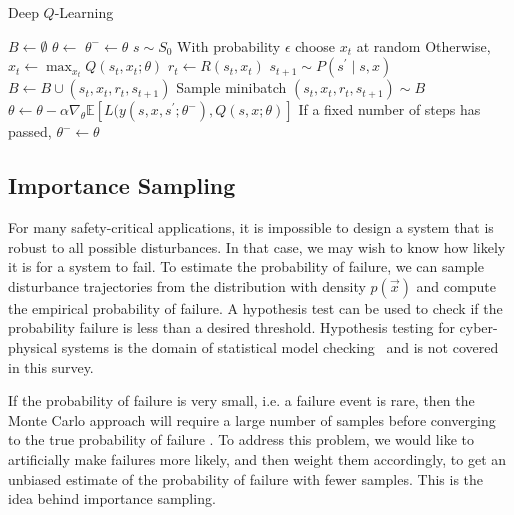 \begin{algorithm}
\caption{Deep $Q$-Learning} \label{alg:dqn}
\begin{algorithmic}[1]
    \State $B \gets \emptyset$ \label{line:dqn_initialize_buffer}
    \State $\theta \gets$  \label{line:dqn_initialize_weights}
    \State $\theta^- \gets \theta$
    \Loop
        \State $s \sim S_0$ \label{line:dqn_sample_ic}
         \label{line:dqn_loop_episode}
            \State With probability $\epsilon$ choose $x_t$ at random \label{line:dqn_rand_action}
            \State Otherwise, $x_t \gets \max_{x_t} Q(s_t, x_t; \theta)$ \label{line:dqn_greedy_action}
            \State $r_t \gets R(s_t, x_t)$ \label{line:dqn_reward}
            \State $s_{t+1} \sim P(s^\prime \mid s, x)$ \label{line:dqn_next_state}
            \State $B \gets B \cup (s_t, x_t, r_t, s_{t+1})$ \label{line:dqn_save_in_replay_buffer}
            \State Sample minibatch $(s_t, x_t, r_t, s_{t+1}) \sim B$ \label{line:dqn_minibatch}
            \State $\theta \gets \theta - \alpha \nabla_{\theta} \mathbb{E}[L(y(s, x, s^\prime; \theta^-), Q(s,x; \theta)]$ \label{line:dqn_update}
            \State If a fixed number of steps has passed, $\theta^- \gets \theta$ \label{line:dqn_target_update}
        \EndWhile
    \EndLoop
    \State \Return{\theta} \label{line:dqn_return}
    \EndFunction
\end{algorithmic}
\end{algorithm}

\subsection{Importance Sampling}
For many safety-critical applications, it is impossible to design a system that is robust to all possible disturbances. In that case, we may wish to know how likely it is for a system to fail. To estimate the probability of failure, we can sample disturbance trajectories from the distribution with density $p(\vec{x})$ and compute the empirical probability of failure. A hypothesis test can be used to check if the probability failure is less than a desired threshold. Hypothesis testing for cyber-physical systems is the domain of statistical model checking~\cite{legay2010statistical,agha2018survey} and is not covered in this survey. 

If the probability of failure is very small, i.e. a failure event is rare, then the Monte Carlo approach will require a large number of samples before converging to the true probability of failure \cite{hahn1972sample}. To address this problem, we would like to artificially make failures more likely, and then weight them accordingly, to get an unbiased estimate of the probability of failure with fewer samples. This is the idea behind importance sampling.

